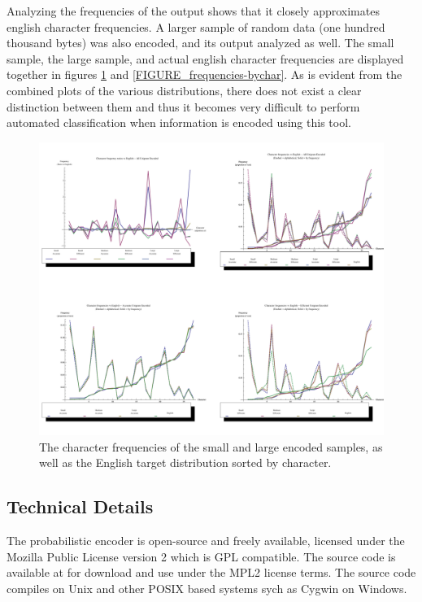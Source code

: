 \documentclass[12pt]{report}
\theoremstyle{remark}
\theoremstyle{definition}
\theoremstyle{definition}
\theoremstyle{definition}
\begin{document}
\begin{appendices}
Analyzing the frequencies of the output shows that it closely approximates
english character frequencies. A larger sample of random data (one hundred
thousand bytes) was also encoded, and its output analyzed as well. The small
sample, the large sample, and actual english character frequencies are displayed
together in figures \ref{FIGURE_frequencies-bytop} and
\ref{FIGURE_frequencies-bychar}. As is evident from the combined plots of the
various distributions, there does not exist a clear distinction between them and
thus it becomes very difficult to perform automated classification when
information is encoded using this tool.

\begin{landscape}
\begin{figure}
\centering
\includegraphics[width=1.15\textwidth]{figures/plots_unigram.pdf}
\caption[Plot of character frequencies by frequency]{The character frequencies of the small and large encoded samples, as well as the English target distribution sorted by character.}
\label{FIGURE_frequencies-bytop}
\end{figure}
\end{landscape}

\subsection{Technical Details} The probabilistic encoder is open-source and
freely available, licensed under the Mozilla Public License version 2 which is
GPL compatible. The source code is available at \cite{probcodesrc} for download
and use under the MPL2 license terms. The source code compiles on Unix and other
POSIX based systems sych as Cygwin on Windows.


\end{appendices}
\end{document}
